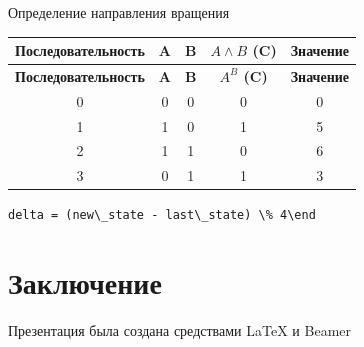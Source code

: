 \begin{frame}[fragile]{Определение направления вращения}
    \begin{longtable}[c]{|c|c|c|c|c|}
        \hline
        \textbf{Последовательность} & \textbf{A} & \textbf{B} & \textbf{$A\land B$ (C)} & \textbf{Значение}\\
        \hline
        \endfirsthead
        \hline
        \textbf{Последовательность} & \textbf{A} & \textbf{B} & \textbf{$A^B$ (C)} & \textbf{Значение}\\
        \hline
        \endhead
            0 & 0 & 0 & 0 & 0\\
            \hline
            1 & 1 & 0 & 1 & 5\\
            \hline
            2 & 1 & 1 & 0 & 6\\
            \hline
            3 & 0 & 1 & 1 & 3\\
            \hline
    \end{longtable}

    \centering
    \pause\verb|delta = (new\_state - last\_state) \% 4\end|

\end{frame}

\section{Заключение}

{
\begin{frame}
    \centering
    \vfill
    \large{Презентация была создана средствами {\LaTeX} и Beamer}
\end{frame}
}
